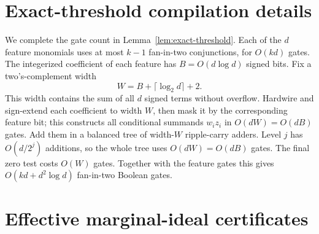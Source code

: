 \documentclass{article}
\begin{document}
\section{Exact-threshold compilation details}
\label{app:threshold-compilation}

We complete the gate count in Lemma~\ref{lem:exact-threshold}.  Each of the
$d$ feature monomials uses at most $k-1$ fan-in-two conjunctions, for
$O(kd)$ gates.  The integerized coefficient of each feature has
$B=O(d\log d)$ signed bits.  Fix a two's-complement width
\[
  W=B+\lceil\log_2 d\rceil+2.
\]
This width contains the sum of all $d$ signed terms without overflow.
Hardwire and sign-extend each coefficient to width $W$, then mask it by the
corresponding feature bit; this constructs all conditional summands $w_i z_i$
in $O(dW)=O(dB)$ gates.  Add them in a balanced tree of width-$W$
ripple-carry adders.  Level $j$ has $O(d/2^j)$ additions, so the whole tree
uses $O(dW)=O(dB)$ gates.  The final zero test costs $O(W)$ gates.  Together
with the feature gates this gives
$O(kd+d^2\log d)$ fan-in-two Boolean gates.

\section{Effective marginal-ideal certificates}
\label{app:effective-certificates}
\end{document}
